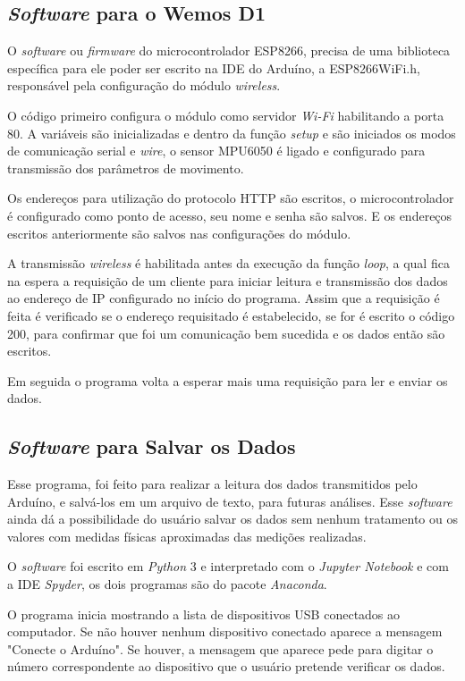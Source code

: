 \subsection{\textit{Software} para o Wemos D1}

	O \textit{software} ou \textit{firmware} do microcontrolador ESP8266,  precisa de uma biblioteca específica para ele poder ser escrito na IDE do Arduíno, a ESP8266WiFi.h, responsável pela configuração do módulo \textit{wireless}. 
	
	O código primeiro configura o módulo como servidor \textit{Wi-Fi} habilitando a porta 80.  A variáveis são inicializadas e dentro da função \textit{setup} e são iniciados os modos de comunicação serial e \textit{wire},  o sensor MPU6050 é ligado e configurado para transmissão  dos parâmetros de movimento. 
	
	Os endereços para utilização do protocolo HTTP são escritos,  o microcontrolador é configurado como ponto de acesso, seu nome e senha são salvos. E os endereços escritos anteriormente são salvos nas configurações do módulo.

	A transmissão \textit{wireless} é habilitada antes da execução da função \textit{loop}, a qual fica na espera a requisição de um cliente para iniciar leitura e transmissão dos dados ao endereço de IP configurado no início do programa. Assim que a requisição é feita é verificado se o endereço requisitado é estabelecido, se for é escrito o código 200, para confirmar que foi um comunicação bem sucedida e os dados então são escritos.
	
	Em seguida o programa volta a esperar mais uma requisição para ler e enviar os dados.
		 
\subsection{\textit{Software} para Salvar os Dados}

		Esse programa, foi feito para realizar a leitura dos dados transmitidos pelo Arduíno, e salvá-los em um arquivo de texto, para futuras análises. Esse \textit{software} ainda dá a possibilidade do usuário salvar os dados sem nenhum tratamento ou os valores com medidas físicas aproximadas das medições realizadas. 
		
		O \textit{software} foi escrito em \textit{Python} 3 e interpretado com o \textit{Jupyter Notebook} e com a IDE \textit{Spyder}, os dois programas são do pacote \textit{Anaconda}. 
		
		O programa inicia mostrando a lista de dispositivos USB conectados ao computador. Se não houver nenhum dispositivo conectado aparece a mensagem "Conecte o Arduíno". Se houver, a mensagem que aparece pede para digitar o número correspondente ao dispositivo que o usuário pretende verificar os dados. 
		
